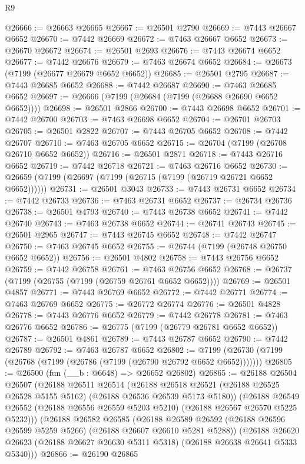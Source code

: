 \begin{lexlean}{R9}
\begin{coremodule}
@26666 := @26663 @26665
@26667 := @26501 @2790
@26669 := @7443 @26667 @6652
@26670 := @7442 @26669
@26672 := @7463 @26667 @6652
@26673 := @26670 @26672
@26674 := @26501 @2693
@26676 := @7443 @26674 @6652
@26677 := @7442 @26676
@26679 := @7463 @26674 @6652
@26684 := @26673 (@7199 (@26677 @26679 @6652 @6652))
@26685 := @26501 @2795
@26687 := @7443 @26685 @6652
@26688 := @7442 @26687
@26690 := @7463 @26685 @6652
@26697 := @26666 (@7199 (@26684 (@7199 (@26688 @26690 @6652 @6652))))
@26698 := @26501 @2866
@26700 := @7443 @26698 @6652
@26701 := @7442 @26700
@26703 := @7463 @26698 @6652
@26704 := @26701 @26703
@26705 := @26501 @2822
@26707 := @7443 @26705 @6652
@26708 := @7442 @26707
@26710 := @7463 @26705 @6652
@26715 := @26704 (@7199 (@26708 @26710 @6652 @6652))
@26716 := @26501 @2871
@26718 := @7443 @26716 @6652
@26719 := @7442 @26718
@26721 := @7463 @26716 @6652
@26730 := @26659 (@7199 (@26697 (@7199 (@26715 (@7199 (@26719 @26721 @6652 @6652))))))
@26731 := @26501 @3043
@26733 := @7443 @26731 @6652
@26734 := @7442 @26733
@26736 := @7463 @26731 @6652
@26737 := @26734 @26736
@26738 := @26501 @4793
@26740 := @7443 @26738 @6652
@26741 := @7442 @26740
@26743 := @7463 @26738 @6652
@26744 := @26741 @26743
@26745 := @26501 @2965
@26747 := @7443 @26745 @6652
@26748 := @7442 @26747
@26750 := @7463 @26745 @6652
@26755 := @26744 (@7199 (@26748 @26750 @6652 @6652))
@26756 := @26501 @4802
@26758 := @7443 @26756 @6652
@26759 := @7442 @26758
@26761 := @7463 @26756 @6652
@26768 := @26737 (@7199 (@26755 (@7199 (@26759 @26761 @6652 @6652))))
@26769 := @26501 @4857
@26771 := @7443 @26769 @6652
@26772 := @7442 @26771
@26774 := @7463 @26769 @6652
@26775 := @26772 @26774
@26776 := @26501 @4828
@26778 := @7443 @26776 @6652
@26779 := @7442 @26778
@26781 := @7463 @26776 @6652
@26786 := @26775 (@7199 (@26779 @26781 @6652 @6652))
@26787 := @26501 @4861
@26789 := @7443 @26787 @6652
@26790 := @7442 @26789
@26792 := @7463 @26787 @6652
@26802 := @7199 (@26730 (@7199 (@26768 (@7199 (@26786 (@7199 (@26790 @26792 @6652 @6652)))))))
@26805 := @26500 (fun (__b : @6648) => @26652 @26802)
@26865 := @26188
    @26504
    @26507
    (@26188
      @26511
      @26514
      (@26188 @26518 @26521 (@26188 @26525 @26528 @5155 @5162) (@26188 @26536 @26539 @5173 @5180))
      (@26188 @26549 @26552 (@26188 @26556 @26559 @5203 @5210) (@26188 @26567 @26570 @5225 @5232)))
    (@26188
      @26582
      @26585
      (@26188 @26589 @26592 (@26188 @26596 @26599 @5259 @5266) (@26188 @26607 @26610 @5281 @5288))
      (@26188 @26620 @26623 (@26188 @26627 @26630 @5311 @5318) (@26188 @26638 @26641 @5333 @5340)))
@26866 := @26190 @26865

\end{coremodule}
\end{lexlean}
